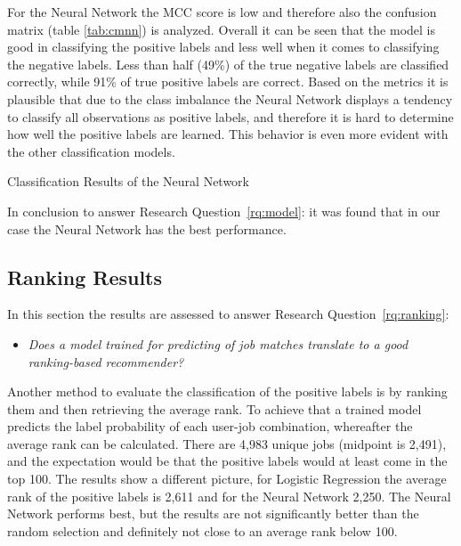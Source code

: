 For the Neural Network the MCC score is low and therefore also the confusion matrix (table \ref{tab:cmnn}) is analyzed.
Overall it can be seen that the model is good in classifying the positive labels and less well when it comes to classifying the negative labels.
Less than half (49\%) of the true negative labels are classified correctly, while 91\% of true positive labels are correct.
Based on the metrics it is plausible that due to the class imbalance the Neural Network displays a tendency to classify all observations as positive labels, and therefore it is hard to determine how well the positive labels are learned.
This behavior is even more evident with the other classification models.

\begin{table}[h]
\begin{footnotesize}

\end{footnotesize}
\caption{\label{tab:cmnn} \footnotesize{Classification Results of the Neural Network}}
\end{table}

In conclusion to answer Research Question~\ref{rq:model}: it was found that in our case the Neural Network has the best performance.

\subsection{Ranking Results}
\label{ssec:rr}

In this section the results are assessed to answer Research Question~\ref{rq:ranking}:
\begin{itemize}
	\item[] \em Does a model trained for predicting of job matches translate to a good ranking-based recommender?
\end{itemize}

\noindent Another method to evaluate the classification of the positive labels is by ranking them and then retrieving the average rank.
To achieve that a trained model predicts the label probability of each user-job combination, whereafter the average rank can be calculated.
There are 4,983 unique jobs (midpoint is 2,491), and the expectation would be that the positive labels would at least come in the top 100. 
The results show a different picture, for Logistic Regression the average rank of the positive labels is 2,611 and for the Neural Network 2,250.
The Neural Network performs best, but the results are not significantly better than the random selection and definitely not close to an average rank below 100.

